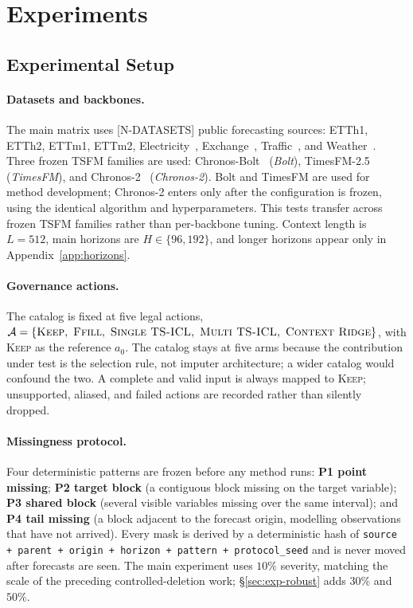 \documentclass{article}
\newcommand{\ph}[1]{\textcolor{phgray}{\textsf{[#1]}}}
\newcommand{\tsfm}{TSFM}
\newcommand{\calA}{\mathcal{A}}
\begin{document}
\section{Experiments}
\label{sec:exp}

\subsection{Experimental Setup}
\label{sec:exp-setup}
\paragraph{Datasets and backbones.}
The main matrix uses \ph{N-DATASETS} public forecasting sources: ETTh1, ETTh2, ETTm1,
ETTm2, Electricity~\citep{uci_electricity}, Exchange~\citep{lai2018lstnet},
Traffic~\citep{pems}, and Weather~\citep{wu2021autoformer}. Three frozen \tsfm{} families
are used: Chronos-Bolt~\citep{chronosbolt2025} (\emph{Bolt}),
TimesFM-2.5~\citep{das2024timesfm} (\emph{TimesFM}), and Chronos-2~\citep{chronos2_2025}
(\emph{Chronos-2}). Bolt and TimesFM are used for method development; Chronos-2 enters
only after the configuration is frozen, using the identical algorithm and hyperparameters.
This tests transfer across frozen \tsfm{} families rather than per-backbone tuning. Context
length is $L = 512$, main horizons are $H \in \{96, 192\}$, and longer horizons appear
only in Appendix~\ref{app:horizons}.

\paragraph{Governance actions.}
The catalog is fixed at five legal actions,
$\calA = \{\textsc{Keep},\ \textsc{Ffill},\ \textsc{Single TS-ICL},\ \textsc{Multi TS-ICL},\ \textsc{Context Ridge}\}$,
with \textsc{Keep} as the reference $a_0$. The catalog stays at five arms because the
contribution under test is the selection rule, not imputer architecture; a wider catalog
would confound the two. A complete and
valid input is always mapped to \textsc{Keep}; unsupported, aliased, and failed actions
are recorded rather than silently dropped.

\paragraph{Missingness protocol.}
Four deterministic patterns are frozen before any method runs: \textbf{P1 point missing};
\textbf{P2 target block} (a contiguous block missing on the target variable);
\textbf{P3 shared block} (several visible variables missing over the same interval); and
\textbf{P4 tail missing} (a block adjacent to the forecast origin, modelling observations
that have not arrived). Every mask is derived by a deterministic hash of
\texttt{source + parent + origin + horizon + pattern + protocol\_seed} and is never moved
after forecasts are seen. The main experiment uses $10\%$ severity, matching the scale of
the preceding controlled-deletion work; \S\ref{sec:exp-robust} adds $30\%$ and $50\%$.
\end{document}
